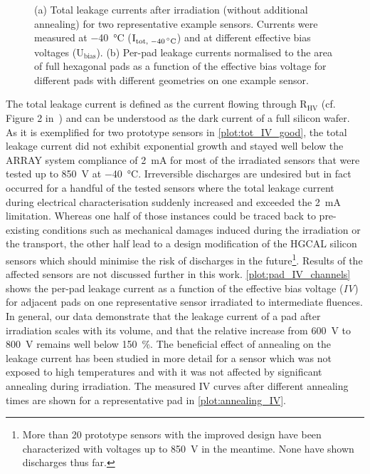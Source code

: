 \begin{figure}
	\caption{
		(a) Total leakage currents after irradiation (without additional annealing) for two representative example sensors. 
		Currents were measured at \SI{-40}{\celsius} ($\text{I}_\text{tot, \SI{-40}{\celsius}}$) and at different effective bias voltages ($\text{U}_\text{bias}$). 
        (b) Per-pad leakage currents normalised to the area of full hexagonal pads as a function of the effective bias voltage for different pads with different geometries on one example sensor.
	}
\end{figure}
The total leakage current is defined as the current flowing through R$_\text{HV}$ (cf. Figure 2 in~\cite{pitters:array2019}) and can be understood as the dark current of a full silicon wafer.
As it is exemplified for two prototype sensors in \ref{plot:tot_IV_good}, the total leakage current did not exhibit exponential growth and stayed well below the ARRAY system compliance of \SI{2}{\milli\ampere} for most of the irradiated sensors that were tested up to \SI{850}{\volt} at \SI{-40}{\celsius}.
Irreversible discharges are undesired but in fact occurred for a handful of the tested sensors where the total leakage current during electrical characterisation suddenly increased and exceeded the \SI{2}{\milli\ampere} limitation.
Whereas one half of those instances could be traced back to pre-existing conditions such as mechanical damages induced during the irradiation or the transport, the other half lead to a design modification of the HGCAL silicon sensors which should minimise the risk of discharges in the future\footnote{More than 20 prototype sensors with the improved design have been characterized with voltages up to \SI{850}{\volt} in the meantime. None have shown discharges thus far.}.
Results of the affected sensors are not discussed further in this work.
\ref{plot:pad_IV_channels} shows the per-pad leakage current as a function of the effective bias voltage (\emph{IV}) for adjacent pads on one representative sensor irradiated to intermediate fluences.
In general, our data demonstrate that the leakage current of a pad after irradiation scales with its volume, and that the relative increase from \SI{600}{\volt} to \SI{800}{\volt} remains well below \SI{150}{\percent}.
The beneficial effect of annealing on the leakage current has been studied in more detail for a sensor which was not exposed to high temperatures and with it was not affected by significant annealing during irradiation.
The measured IV curves after different annealing times are shown for a representative pad in \ref{plot:annealing_IV}.

